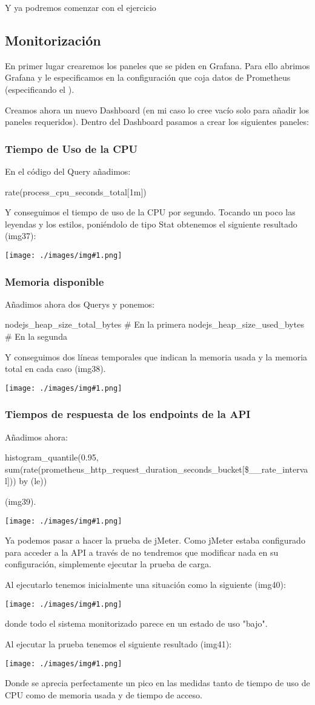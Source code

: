 \documentclass[12pt]{article}
\newcommand{\icode}[1]{\colorbox{codebg}{\texttt{\detokenize{#1}}}}
\newcommand{\img}[1] {
    \begin{center}
        \texttt{[image: ./images/img\#1.png]}
    \end{center}
}
\begin{document}
Y ya podremos comenzar con el ejercicio

\subsection{Monitorización}

En primer lugar crearemos los paneles que se piden en Grafana. Para ello abrimos Grafana y le especificamos en la configuración que coja datos de Prometheus (especificando el \icode{Data Source}).

Creamos ahora un nuevo Dashboard (en mi caso lo cree vacío solo para añadir los paneles requeridos). Dentro del Dashboard pasamos a crear los siguientes paneles:

\subsubsection{Tiempo de Uso de la CPU}
En el código del Query añadimos:

\begin{icodeblock}
rate(process_cpu_seconds_total[1m])
\end{icodeblock}

Y conseguimos el tiempo de uso de la CPU por segundo. Tocando un poco las leyendas y los estilos, poniéndolo de tipo Stat obtenemos el siguiente resultado (img37):
\img{37}

\subsubsection{Memoria disponible}
Añadimos ahora dos Querys y ponemos:

\begin{icodeblock}[bash]
nodejs_heap_size_total_bytes # En la primera
nodejs_heap_size_used_bytes  # En la segunda
\end{icodeblock}

Y conseguimos dos líneas temporales que indican la memoria usada y la memoria total en cada caso (img38).

\img{38}
\subsubsection{Tiempos de respuesta de los endpoints de la API}
Añadimos ahora:
\begin{icodeblock}[bash]
histogram_quantile(0.95, sum(rate(prometheus_http_request_duration_seconds_bucket[\$__rate_interval])) by (le))
\end{icodeblock}
(img39).

\img{39}
Ya podemos pasar a hacer la prueba de jMeter. Como jMeter estaba configurado para acceder a la API a través de \icode{localhost:3000} no tendremos que modificar nada en su configuración, simplemente ejecutar la prueba de carga.

Al ejecutarlo tenemos inicialmente una situación como la siguiente (img40):
\img{40}
donde todo el sistema monitorizado parece en un estado de uso "bajo".

Al ejecutar la prueba tenemos el siguiente resultado (img41):
\img{41}

Donde se aprecia perfectamente un pico en las medidas tanto de tiempo de uso de CPU como de memoria usada y de tiempo de acceso.
\end{document}
